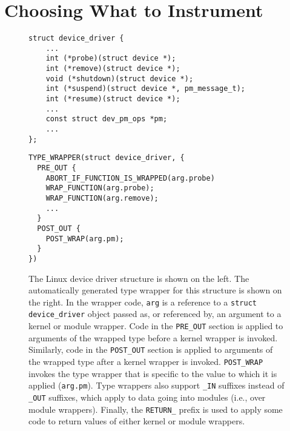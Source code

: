 \documentclass[preprint]{sigplanconf}
\begin{document}

\section{Choosing What to Instrument}

\begin{figure*}[ht!]
\lstset{language=C, tabsize=2, stepnumber=1}
\begin{multicols}{2}
\begin{lstlisting}[basicstyle=\footnotesize\ttfamily]
struct device_driver {
	...
	int (*probe)(struct device *);
	int (*remove)(struct device *);
	void (*shutdown)(struct device *);
	int (*suspend)(struct device *, pm_message_t);
	int (*resume)(struct device *);
	...
	const struct dev_pm_ops *pm;
	...
};
\end{lstlisting}
\columnbreak
\begin{lstlisting}[basicstyle=\footnotesize\ttfamily]
TYPE_WRAPPER(struct device_driver, {
  PRE_OUT {
    ABORT_IF_FUNCTION_IS_WRAPPED(arg.probe)
    WRAP_FUNCTION(arg.probe);
    WRAP_FUNCTION(arg.remove);
    ...
  }
  POST_OUT {
    POST_WRAP(arg.pm);
  }
})
\end{lstlisting}
\end{multicols}
\caption{The Linux device driver structure is shown on the left. The automatically generated type wrapper for this structure is shown on the right. In the wrapper code, \texttt{arg} is a reference to a \texttt{struct device\_driver} object passed as, or referenced by, an argument to a kernel or module wrapper. Code in the \texttt{PRE\_OUT} section is applied to arguments of the wrapped type before a kernel wrapper is invoked. Similarly, code in the \texttt{POST\_OUT} section is applied to arguments of the wrapped type after a kernel wrapper is invoked. \texttt{POST\_WRAP} invokes the type wrapper that is specific to the value to which it is applied (\texttt{arg.pm}). Type wrappers also support \texttt{\_IN} suffixes instead of \texttt{\_OUT} suffixes, which apply to data going into modules (i.e., over module wrappers). Finally, the \texttt{RETURN\_} prefix is used to apply some code to return values of either kernel or module wrappers.}
\label{fig:type_wrapper}
\end{figure*}
\end{document}
